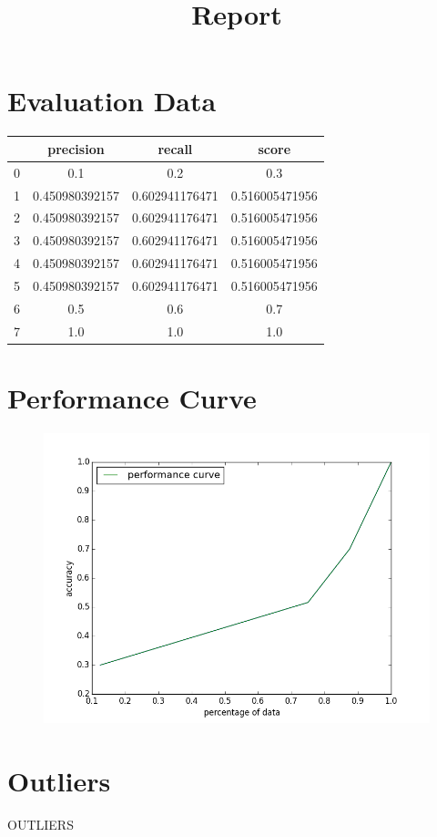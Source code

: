 \documentclass[a4paper,10pt]{article}
\begin{document}
\title{Report}
\maketitle
\section*{Evaluation Data}
 
\begin{table}[htbp]
\centering
\begin{tabular}{|c|c|c|c|}
\hline
&precision&recall&score\\
\hline
				0&0.1&0.2&0.3\\
1&0.450980392157&0.602941176471&0.516005471956\\
2&0.450980392157&0.602941176471&0.516005471956\\
3&0.450980392157&0.602941176471&0.516005471956\\
4&0.450980392157&0.602941176471&0.516005471956\\
5&0.450980392157&0.602941176471&0.516005471956\\
6&0.5&0.6&0.7\\
7&1.0&1.0&1.0\\

\hline
\end{tabular}
\end{table}
				 
\section*{Performance Curve}
\begin{figure}[!htbp]
\centering
\includegraphics[width = 15cm]{performance.png} 
\end{figure}
\section*{Outliers}
OUTLIERS
\end{document}
